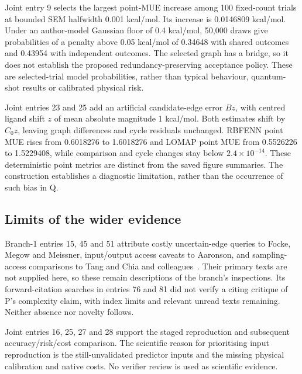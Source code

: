 \documentclass{article}
\begin{document}
Joint entry 9 selects the largest point-MUE increase among 100 fixed-count trials at bounded SEM halfwidth 0.001 kcal/mol. Its increase is 0.0146809 kcal/mol. Under an author-model Gaussian floor of 0.4 kcal/mol, 50,000 draws give probabilities of a penalty above 0.05 kcal/mol of 0.34648 with shared outcomes and 0.43954 with independent outcomes. The selected graph has a bridge, so it does not establish the proposed redundancy-preserving acceptance policy. These are selected-trial model probabilities, rather than typical behaviour, quantum-shot results or calibrated physical risk.

Joint entries 23 and 25 add an artificial candidate-edge error \(Bz\), with centred ligand shift \(z\) of mean absolute magnitude 1 kcal/mol. Both estimates shift by \(C_0z\), leaving graph differences and cycle residuals unchanged. RBFENN point MUE rises from 0.6018276 to 1.6018276 and LOMAP point MUE from 0.5526226 to 1.5229408, while comparison and cycle changes stay below \(2.4\times10^{-14}\). These deterministic point metrics are distinct from the saved figure summaries. The construction establishes a diagnostic limitation, rather than the occurrence of such bias in Q.

\subsection{Limits of the wider evidence}

Branch-1 entries 15, 45 and 51 attribute costly uncertain-edge queries to Focke, Megow and Meissner, input/output access caveats to Aaronson, and sampling-access comparisons to Tang and Chia and colleagues~\cite{queries,fineprint,Tang,Chia}. Their primary texts are not supplied here, so these remain descriptions of the branch's inspections. Its forward-citation searches in entries 76 and 81 did not verify a citing critique of P's complexity claim, with index limits and relevant unread texts remaining. Neither absence nor novelty follows.

Joint entries 16, 25, 27 and 28 support the staged reproduction and subsequent accuracy/risk/cost comparison. The scientific reason for prioritising input reproduction is the still-unvalidated predictor inputs and the missing physical calibration and native costs. No verifier review is used as scientific evidence.



\end{document}
